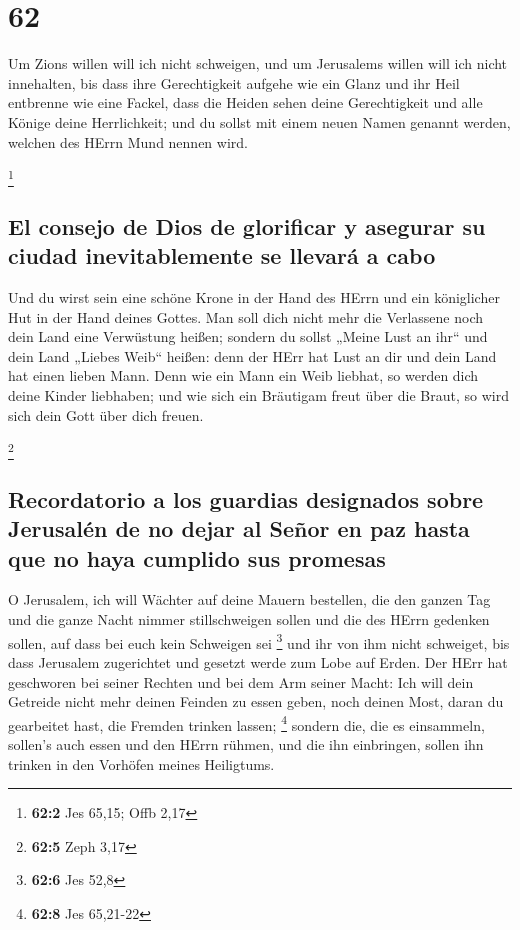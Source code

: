 \hypertarget{section-61}{%
\section{62}\label{section-61}}

 Um Zions willen will ich nicht schweigen, und um
Jerusalems willen will ich nicht innehalten, bis dass ihre Gerechtigkeit
aufgehe wie ein Glanz und ihr Heil entbrenne wie eine Fackel,
 dass die Heiden sehen deine Gerechtigkeit und alle Könige
deine Herrlichkeit; und du sollst mit einem neuen Namen genannt werden,
welchen des HErrn Mund nennen wird.

\footnote{\textbf{62:2} Jes 65,15; Offb 2,17}

\hypertarget{el-consejo-de-dios-de-glorificar-y-asegurar-su-ciudad-inevitablemente-se-llevaruxe1-a-cabo}{%
\subsection{El consejo de Dios de glorificar y asegurar su ciudad
inevitablemente se llevará a
cabo}\label{el-consejo-de-dios-de-glorificar-y-asegurar-su-ciudad-inevitablemente-se-llevaruxe1-a-cabo}}

 Und du wirst sein eine schöne Krone in der Hand des HErrn
und ein königlicher Hut in der Hand deines Gottes.  Man
soll dich nicht mehr die Verlassene noch dein Land eine Verwüstung
heißen; sondern du sollst „Meine Lust an ihr`` und dein Land „Liebes
Weib`` heißen: denn der HErr hat Lust an dir und dein Land hat einen
lieben Mann.  Denn wie ein Mann ein Weib liebhat, so
werden dich deine Kinder liebhaben; und wie sich ein Bräutigam freut
über die Braut, so wird sich dein Gott über dich freuen.

\footnote{\textbf{62:5} Zeph 3,17}

\hypertarget{recordatorio-a-los-guardias-designados-sobre-jerusaluxe9n-de-no-dejar-al-seuxf1or-en-paz-hasta-que-no-haya-cumplido-sus-promesas}{%
\subsection{Recordatorio a los guardias designados sobre Jerusalén de no
dejar al Señor en paz hasta que no haya cumplido sus
promesas}\label{recordatorio-a-los-guardias-designados-sobre-jerusaluxe9n-de-no-dejar-al-seuxf1or-en-paz-hasta-que-no-haya-cumplido-sus-promesas}}

 O Jerusalem, ich will Wächter auf deine Mauern bestellen,
die den ganzen Tag und die ganze Nacht nimmer stillschweigen sollen und
die des HErrn gedenken sollen, auf dass bei euch kein Schweigen sei
\footnote{\textbf{62:6} Jes 52,8}  und ihr von ihm nicht
schweiget, bis dass Jerusalem zugerichtet und gesetzt werde zum Lobe auf
Erden.  Der HErr hat geschworen bei seiner Rechten und bei
dem Arm seiner Macht: Ich will dein Getreide nicht mehr deinen Feinden
zu essen geben, noch deinen Most, daran du gearbeitet hast, die Fremden
trinken lassen; \footnote{\textbf{62:8} Jes 65,21-22} 
sondern die, die es einsammeln, sollen's auch essen und den HErrn
rühmen, und die ihn einbringen, sollen ihn trinken in den Vorhöfen
meines Heiligtums.

